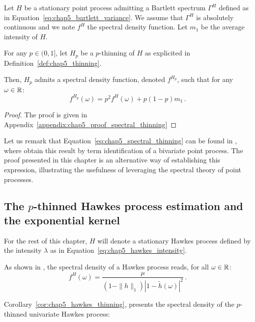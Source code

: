 \begin{proposition}\label{prop:chap5_spectral_thinning}
    Let $H$ be a stationary point process admitting a Bartlett spectrum $\Gamma^H$ defined as in Equation~\eqref{eq:chap5_bartlett_variance}.
    We assume that $\Gamma^H$ is absolutely continuous and we note $f^H$ the spectral density function. 
    Let $m_1$ be the average intensity of $H$.

    For any $p\in(0,1]$, let $H_p$ be a $p$-thinning of $H$ as explicited in Definition~\ref{def:chap5_thinning}.

    Then, $H_p$ admits a spectral density function, denoted $f^{H_p}$, such that for any $\omega\in{\mathbb R}$:
    \begin{equation}\label{eq:chap5_spectral_thinning}
        f^{H_p}(\omega) = p^2 f^H(\omega) + p(1-p)m_1\,.
    \end{equation}

\end{proposition}

\begin{proof}
    The proof is given in Appendix~\ref{appendix:chap5_proof_spectral_thinning}
\end{proof}

    Let us remark that Equation~\eqref{eq:chap5_spectral_thinning} can be found in \textcite[Equation 8.3.5]{DaleyV1}, where obtain this result by term identification of a bivariate point process. 
    The proof presented in this chapter is an alternative way of establishing this expression,
    illustrating the usefulness of leveraging the spectral theory of point processes.


    \subsection{The $p$-thinned Hawkes process estimation and the exponential kernel}\label{sec:chap5_thinned_hawkes}

    For the rest of this chapter, 
    $H$ will denote a stationary Hawkes process defined by the intensity $\lambda$ as in Equation~\eqref{eq:chap5_hawkes_intensity}.

    As shown in \textcite{Hawkes1971}, the spectral density of a Hawkes process reads, for all $\omega\in{\mathbb R}$:
    \[f^H(\omega) = \frac{\mu}{(1-\|h\|_1)|1-\tilde h(\omega)|^2}\,.\]

    Corollary~\ref{cor:chap5_hawkes_thinning}, presents the spectral density of the $p$-thinned univariate Hawkes process:

